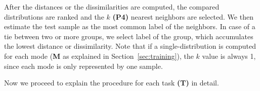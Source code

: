 \documentclass{sig-alternate}
\begin{document}
After the distances or the dissimilarities are computed, the compared distributions are ranked and the $k$ {\bf (P4)} nearest neighbors are selected. We then estimate the test sample as the most common label of the neighbors. In case of a tie between two or more groups, we select label of the group, which accumulates the lowest distance or dissimilarity. Note that if a single-distribution is computed for each mode ({\bf M} as explained in Section~\ref{sec:training}), the $k$ value is always 1, since each mode is only represented by one sample.

Now we proceed to explain the procedure for each task {\bf(T)} in detail.

%
%
%
%
%
%
%
%
\end{document}
